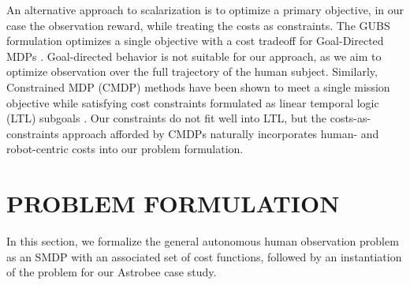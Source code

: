 \documentclass[letterpaper, 10 pt, conference]{ieeeconf}  %
\begin{document}
An alternative approach to scalarization is to optimize a primary objective, in our case the observation reward, while treating the costs as constraints.  The GUBS formulation optimizes a single objective with a cost tradeoff for Goal-Directed MDPs \cite{freire2017gubs}.  Goal-directed behavior is not suitable for our approach, as we aim to optimize observation over the full trajectory of the human subject.  Similarly, Constrained MDP (CMDP) methods have been shown to meet a single mission objective while satisfying cost constraints formulated as linear temporal logic (LTL) subgoals \cite{ding2014hierarchical, feyzabadi2016multi}.  Our constraints do not fit well into LTL, but the costs-as-constraints approach afforded by CMDPs naturally incorporates human- and robot-centric costs into our problem formulation.


\section{PROBLEM FORMULATION}
In this section, we formalize the general autonomous human observation problem as an SMDP with an associated set of cost functions, followed by an instantiation of the problem for our Astrobee case study.
\end{document}
